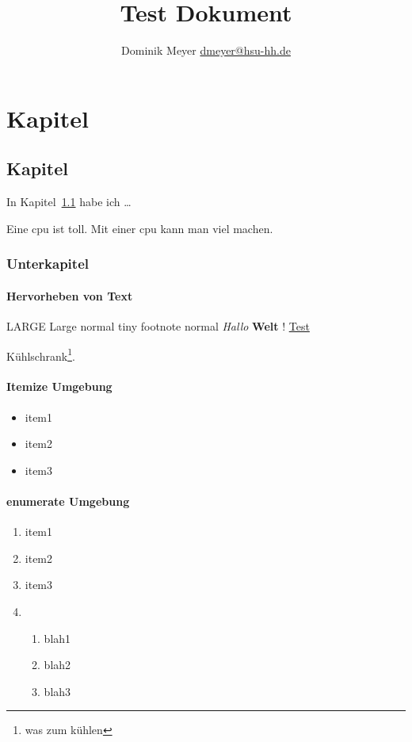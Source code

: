 \documentclass{scrbook}
\title{Test Dokument}
\author{Dominik Meyer \url{dmeyer@hsu-hh.de}}
\begin{document}
\maketitle
\newpage
\printglossary[type=\acronymtype,title=acronyms,style=long]
\listoffigures
\listoftables
\tableofcontents


\chapter{Kapitel}
\section{Kapitel}
\label{chap:kapitel:kapitel}

In Kapitel~\ref{chap:kapitel:kapitel} habe ich \ldots

Eine \gls{cpu} ist toll. Mit einer \gls{cpu} kann man viel machen.
\subsection{Unterkapitel}
\subsubsection{Hervorheben von Text}
\LARGE LARGE
\Large Large
\normalsize normal
\tiny tiny
\footnotesize footnote
\normalsize normal
\emph{Hallo} \textbf{Welt} ! \underline{Test}

Kühlschrank\footnote{was zum kühlen}.

\subsubsection{Itemize Umgebung}
\begin{itemize}
  \item item1
  \item item2
  \item item3
\end{itemize}

\subsubsection{enumerate Umgebung}

\begin{enumerate}
  \item item1
  \item item2
  \item item3
  \item \begin{enumerate}
    \item blah1
    \item blah2
    \item blah3
  \end{enumerate}
\end{enumerate}
\end{document}
